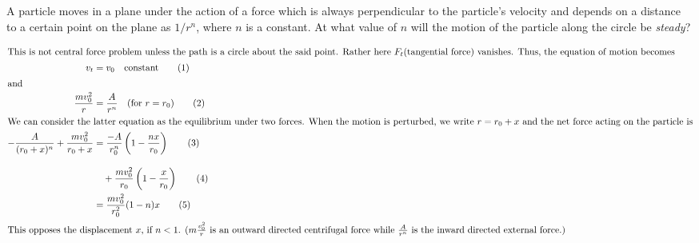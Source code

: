 \item A particle moves in a plane under the action of a force which is always perpendicular to the particle's velocity and depends on a distance to a certain point on the plane as \( 1/r^n \), where \( n \) is a constant. At what value of \( n \) will the motion of the particle along the circle be \textit{steady}?\begin{solution}
    \begin{center}
    \end{center}
    
    \begin{align*}
        \intertext{This is not central force problem unless the path is a circle about the said point. Rather here \(F_t ( \text{tangential force})\) vanishes. Thus, the equation of motion becomes}
        v_t &= v_0 \quad \text{constant} \tag{1}\\
        \intertext{and} 
        \frac{m v_0^2}{r} &= \frac{A}{r^n} \quad (\text{for } r = r_0) \tag{2}\\
        \intertext{We can consider the latter equation as the equilibrium under two forces. When the motion is perturbed, we write \(r = r_0 + x\) and the net force acting on the particle is}
        -\frac{A}{(r_0 + x)^n} + \frac{m v_0^2}{r_0 + x} &= \frac{-A}{r_0^n} \left( 1 - \frac{nx}{r_0} \right) \tag{3}\\
        \intertext{ }
        &\quad+ \frac{m v_0^2}{r_0} \left( 1 - \frac{x}{r_0} \right) \tag{4}\\
        & = \frac{m v_0^2}{r_0^2} (1 - n) x \tag{5}\\
        \intertext{This opposes the displacement \(x\), if \( n < 1 \). (\( m \frac{v_0^2}{r} \) is an outward directed centrifugal force while \(\frac{A}{r^n}\) is the inward directed external force.)}
    \end{align*}
\end{solution}